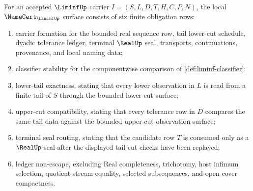 \begin{theorem}
\label{thm:liminf-namecert-obligations}
For an accepted $\LiminfUp$ carrier $I=(S,L,D,T,H,C,P,N)$, the local $\NameCert_{\LiminfUp}$ surface consists of six finite obligation rows:
\begin{enumerate}
\item carrier formation for the bounded real sequence row, tail lower-cut schedule, dyadic tolerance ledger, terminal $\RealUp$ seal, transports, continuations, provenance, and local naming data;
\item classifier stability for the componentwise comparison of \autoref{def:liminf-classifier};
\item lower-tail exactness, stating that every lower observation in $L$ is read from a finite tail of $S$ through the bounded lower-cut surface;
\item upper-cut compatibility, stating that every tolerance row in $D$ compares the same tail data against the bounded upper-cut observation surface;
\item terminal seal routing, stating that the candidate row $T$ is consumed only as a $\RealUp$ seal after the displayed tail-cut checks have been replayed;
\item ledger non-escape, excluding Real completeness, trichotomy, host infimum selection, quotient stream equality, selected subsequences, and open-cover compactness.
\end{enumerate}
\end{theorem}
